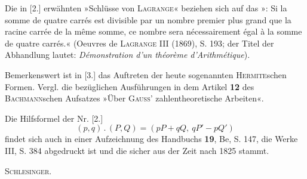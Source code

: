 \noindent\hspace*{\parindent}Die in [2.] erwähnten »Schlüsse von \textsc{Lagrange}« beziehen sich auf das »: Si la somme de
quatre carrés est divisible par un nombre premier plus grand que la racine carrée de la même somme, ce
nombre sera nécessairement égal à la somme de quatre carrés.« (Oeuvres de \textsc{Lagrange} III (1869), S. 193;
der Titel der Abhandlung lautet: \textit{Démonstration d’un théorème d’Arithmétique}).

Bemerkenswert ist in [3.] das Auftreten der heute sogenannten \textsc{Hermite}schen Formen. Vergl. die
bezüglichen Ausführungen in dem Artikel \textbf{12} des \textsc{Bachmann}schen Aufsatzes »Über \textsc{Gauss}’ zahlentheoretische
Arbeiten«.

Die Hilfsformel der Nr. [2.]
\[
(p,q)\mathbin{.}(P,Q)=(pP+qQ,\ qP'-pQ')
\]
\noindent findet sich auch in einer Aufzeichnung des Handbuchs \textbf{19}, Be, S. 147, die Werke III, S. 384 abgedruckt
ist und die sicher aus der Zeit nach 1825 stammt.
\par\hfill\textsc{Schlesinger.}\par
\endgroup
\ClosingRule
\clearpage

